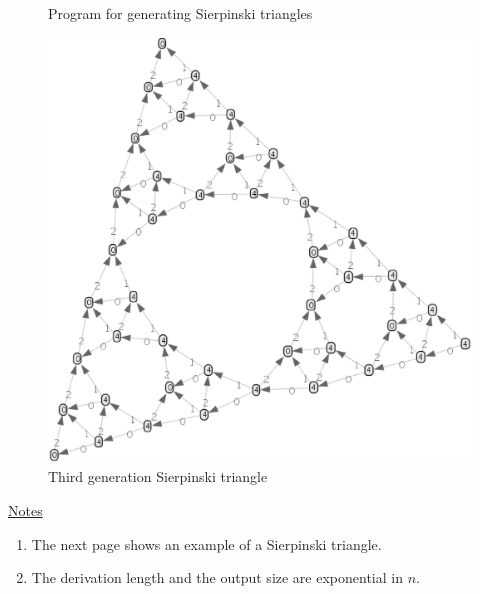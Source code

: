 \begin{figure}[p]
\begin{center}

\end{center}
\caption{Program for generating Sierpinski triangles}\label{fig:Sierpinski-program}
 \begin{center}
  \includegraphics[scale=.35,angle=-15]{sierpinski-3.eps}
 \end{center}
\vspace*{-2.5cm}
\caption{Third generation Sierpinski triangle \label{fig:sierpinski}}
\end{figure}

\ul{Notes}
\begin{enumerate}
\setlength{\itemsep}{-.5ex}
\item The next page shows an example of a Sierpinski triangle.
\item The derivation length and the output size are exponential in $n$.
\end{enumerate}



